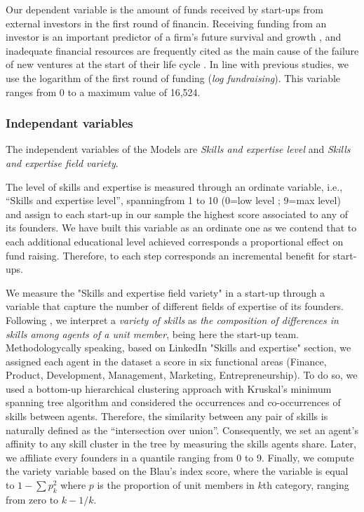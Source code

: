 \documentclass[12pt]{article}
\begin{document}
Our dependent variable is the amount of funds received by start-ups from external investors in the first round of financin. Receiving funding from an investor is an important predictor of a firm's future survival and growth \citep{beckman2007early}, and inadequate financial resources are frequently cited as the main cause of the failure of new ventures at the start of their life cycle \citep{franke2008venture, eddleston2016you}. In line with previous studies, we use the logarithm of the first round of funding (\textit{log fundraising}). This variable ranges from 0 to a maximum value of 16,524.

\subsubsection{Independant variables}

The independent variables of the Models are \textit{Skills and expertise level} and \textit{Skills and expertise field variety}.

The level of skills and expertise is measured through an ordinate variable, i.e., “Skills and expertise level”, spanningfrom 1 to 10 (0=low level ; 9=max level) and assign to each start-up in our sample the highest score associated to any of its founders. We have built this variable as an ordinate one as we contend that to each additional educational level achieved corresponds a proportional effect on fund raising. Therefore, to each step corresponds an incremental benefit for start-ups.

We measure the "Skills and expertise field variety" in a start-up through a variable that capture the number of different fields of expertise of its founders. Following \citet{harrison2007s}, we interpret a \textit{variety of skills} as \textit{the composition of differences in skills among agents of a unit member}, being here the start-up team. Methodologycally speaking, based on LinkedIn "Skills and expertise" section, we assigned each agent in the dataset a score in six functional areas (Finance, Product, Development, Management, Marketing, Entrepreneurship). To do so, we used a bottom-up hierarchical clustering approach with Kruskal’s minimum spanning tree algorithm \citep{kruskal1956shortest} and considered the occurrences and co-occurrences of skills between agents. Therefore, the similarity between any pair of skills is naturally defined as the “intersection over union”. Consequently, we set an agent’s affinity to any skill cluster in the tree by measuring the skills agents share. Later, we affiliate every founders in a quantile ranging from 0 to 9. Finally, we compute the variety variable based on the Blau's index score, where the variable is equal to $1-\sum p_k^2$ where $p$ is the proportion of unit members in $k$th category, ranging from zero to $k-1/k$.
\end{document}
